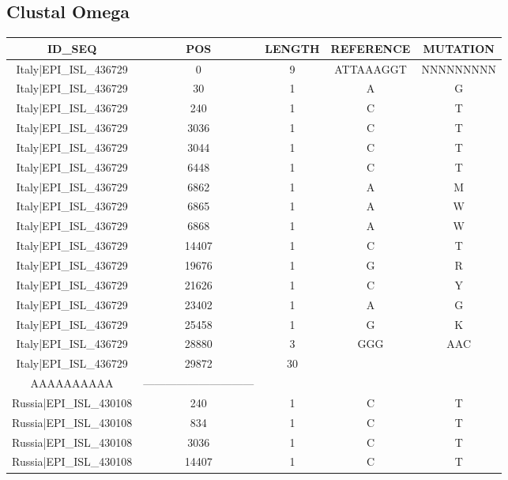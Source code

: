 \documentclass[a4paper,10pt]{article}
\begin{document}
\subsection{Clustal Omega}

\setlength\LTleft{-2.3 cm}
\begin{longtable}{@{}ccccc@{}}
\toprule
\textbf{ID\_SEQ} & \textbf{POS} & \textbf{LENGTH} & \textbf{REFERENCE} & \textbf{MUTATION} \\* \midrule
\endfirsthead
%
\cline{1-5}
\endhead
%
Italy|EPI\_ISL\_436729 & 0 & 9 & ATTAAAGGT & NNNNNNNNN \\* \midrule
Italy|EPI\_ISL\_436729 & 30 & 1 & A & G \\* \midrule
Italy|EPI\_ISL\_436729 & 240 & 1 & C & T \\* \midrule
Italy|EPI\_ISL\_436729 & 3036 & 1 & C & T \\* \midrule
Italy|EPI\_ISL\_436729 & 3044 & 1 & C & T \\* \midrule
Italy|EPI\_ISL\_436729 & 6448 & 1 & C & T \\* \midrule
Italy|EPI\_ISL\_436729 & 6862 & 1 & A & M \\* \midrule
Italy|EPI\_ISL\_436729 & 6865 & 1 & A & W \\* \midrule
Italy|EPI\_ISL\_436729 & 6868 & 1 & A & W \\* \midrule
Italy|EPI\_ISL\_436729 & 14407 & 1 & C & T \\* \midrule
Italy|EPI\_ISL\_436729 & 19676 & 1 & G & R \\* \midrule
Italy|EPI\_ISL\_436729 & 21626 & 1 & C & Y \\* \midrule
Italy|EPI\_ISL\_436729 & 23402 & 1 & A & G \\* \midrule
Italy|EPI\_ISL\_436729 & 25458 & 1 & G & K \\* \midrule
Italy|EPI\_ISL\_436729 & 28880 & 3 & GGG & AAC \\* \midrule
Italy|EPI\_ISL\_436729 & 29872 & 30 & \begin{tabular}[c]{@{}c@{}}AAAAAAAAAAAAAAAAAAAA\\ AAAAAAAAAA\end{tabular} & ------------------------------ \\* \midrule
Russia|EPI\_ISL\_430108 & 240 & 1 & C & T \\* \midrule
Russia|EPI\_ISL\_430108 & 834 & 1 & C & T \\* \midrule
Russia|EPI\_ISL\_430108 & 3036 & 1 & C & T \\* \midrule
Russia|EPI\_ISL\_430108 & 14407 & 1 & C & T \\* \midrule

\end{longtable}
\end{document}
